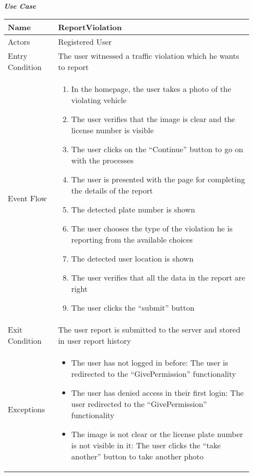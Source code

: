 

\begin{table}[H]
\begin{flushleft}\emph{\textbf{Use Case}}\end{flushleft}
\footnotesize
\centering
\settowidth{}
\setlength\extrarowheight{2pt}
\begin{tabulary}{\textwidth}{|J|J|}
\hline
Name            & ReportViolation \\
\hline
Actors          & Registered User \\
\hline
Entry Condition & The user witnessed a traffic violation which he wants to report \\
\hline
Event Flow      & 
\begin{minipage}[t]{0.7\textwidth}
\begin{enumerate} 
\item In the homepage, the user takes a photo of the violating vehicle
\item The user verifies that the image is clear and the license number is visible
\item The user clicks on the “Continue” button to go on with the processes
\item The user is presented with the page for completing the details of the report
\item The detected plate number is shown
\item The user chooses the type of the violation he is reporting from the available choices
\item The detected user location is shown
\item The user verifies that all the data in the report are right
\item The user clicks the “submit” button
\end{enumerate}
\end{minipage}\\
\hline
Exit Condition  & The user report is submitted to the server and stored in user report history \\
\hline
Exceptions      & 
\begin{minipage}[t]{0.8\textwidth}
\begin{itemize} 
\item The user has not logged in before: The user is redirected to the “GivePermission” functionality
\item The user has denied access in their first login:   The user redirected to the “GivePermission” functionality
\item The image is not clear or the license plate number is not visible in it: The user clicks the “take another” button to take another photo

\end{itemize}
\end{minipage}
\end{tabulary}
\end{table}
